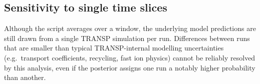 \documentclass[11pt,a4paper]{article}
\begin{document}
\subsection{Sensitivity to single time slices}

Although the script averages over a window, the underlying model
predictions are still drawn from a single TRANSP simulation per run.
Differences between runs that are smaller than typical TRANSP-internal
modelling uncertainties (e.g.\ transport coefficients, recycling, fast
ion physics) cannot be reliably resolved by this analysis, even if the
posterior assigns one run a notably higher probability than another.
\end{document}
